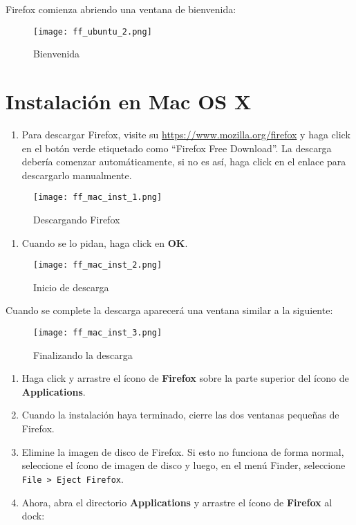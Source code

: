 \documentclass[10pt,a5paper,twoside,,]{book}
\providecommand{\tightlist}{%
  \setlength{\itemsep}{0pt}\setlength{\parskip}{0pt}}
\begin{document}
Firefox comienza abriendo una ventana de bienvenida:

\begin{figure}[htbp]
\centering
\texttt{[image: ff\_ubuntu\_2.png]}
\caption{Bienvenida}
\end{figure}

\chapter{Instalación en Mac OS X}\label{instalaciuxf3n-en-mac-os-x}

\begin{enumerate}
\def\labelenumi{\arabic{enumi}.}
\tightlist
\item
  Para descargar Firefox, visite su
  \url{https://www.mozilla.org/firefox} y haga click en el botón verde
  etiquetado como ``Firefox Free Download''. La descarga debería
  comenzar automáticamente, si no es así, haga click en el enlace para
  descargarlo manualmente.
\end{enumerate}

\begin{figure}[htbp]
\centering
\texttt{[image: ff\_mac\_inst\_1.png]}
\caption{Descargando Firefox}
\end{figure}

\begin{enumerate}
\def\labelenumi{\arabic{enumi}.}
\setcounter{enumi}{1}
\tightlist
\item
  Cuando se lo pidan, haga click en \textbf{OK}.
\end{enumerate}

\begin{figure}[htbp]
\centering
\texttt{[image: ff\_mac\_inst\_2.png]}
\caption{Inicio de descarga}
\end{figure}

Cuando se complete la descarga aparecerá una ventana similar a la
siguiente:

\begin{figure}[htbp]
\centering
\texttt{[image: ff\_mac\_inst\_3.png]}
\caption{Finalizando la descarga}
\end{figure}

\begin{enumerate}
\def\labelenumi{\arabic{enumi}.}
\setcounter{enumi}{2}
\item
  Haga click y arrastre el ícono de \textbf{Firefox} sobre la parte
  superior del ícono de \textbf{Applications}.
\item
  Cuando la instalación haya terminado, cierre las dos ventanas pequeñas
  de Firefox.
\item
  Elimine la imagen de disco de Firefox. Si esto no funciona de forma
  normal, seleccione el ícono de imagen de disco y luego, en el menú
  Finder, seleccione \texttt{File\ \textgreater{}\ Eject\ Firefox}.
\item
  Ahora, abra el directorio \textbf{Applications} y arrastre el ícono de
  \textbf{Firefox} al dock:
\end{enumerate}
\end{document}
